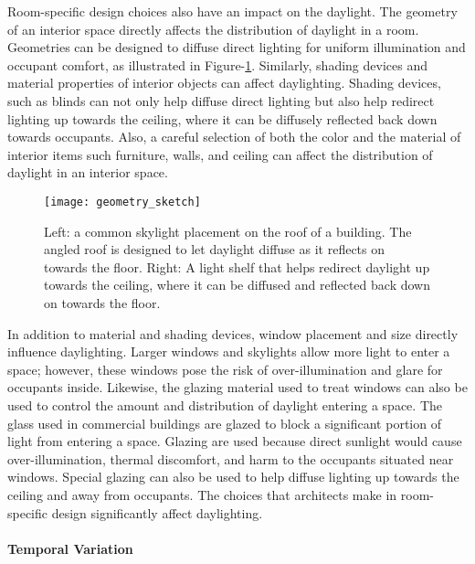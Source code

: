 Room-specific design choices also have an impact on the daylight.  The geometry of an interior space directly affects the distribution of daylight in a room.  Geometries can be designed to diffuse direct lighting for uniform illumination and occupant comfort, as illustrated in Figure-\ref{fig:geometry_sketch}.  Similarly, shading devices and material properties of interior objects can affect daylighting.  Shading devices, such as blinds can not only help diffuse direct lighting but also help redirect lighting up towards the ceiling, where it can be diffusely reflected back down towards occupants.  Also, a careful selection of both the color and the material of interior items such furniture, walls, and ceiling can affect the distribution of daylight in an interior space. \\

\begin{figure}[h]
\centering
\texttt{[image: geometry\_sketch]}
\caption[Daylight distribution with varying architectural geometries.]{Left: a common skylight placement on the roof of a building. The angled roof is designed to let daylight diffuse as it reflects on towards the floor. Right: A light shelf that helps redirect daylight up towards the ceiling, where it can be diffused and reflected back down on towards the floor.}
\label{fig:geometry_sketch}
\end{figure}

In addition to material and shading devices, window placement and size directly influence daylighting.  Larger windows and skylights allow more light to enter a space; however, these windows pose the risk of over-illumination and glare for occupants inside.  Likewise, the glazing material used to treat windows can also be used to control the amount and distribution of daylight entering a space.  The glass used in commercial buildings are glazed to block a significant portion of light from entering a space.  Glazing are used because direct sunlight would cause over-illumination, thermal discomfort, and harm to the occupants situated near windows.  Special glazing can also be used to help diffuse lighting up towards the ceiling and away from occupants.  The choices that architects make in room-specific design significantly affect daylighting.\\

\paragraph{Temporal Variation} 

